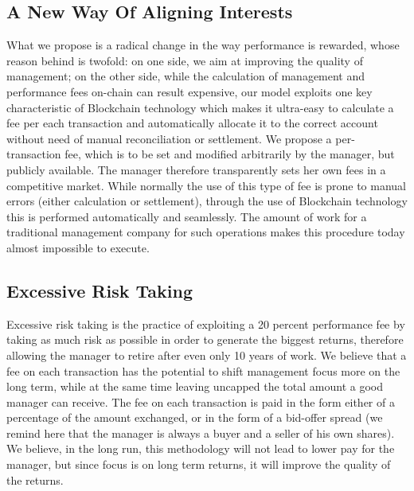 \documentclass[9pt,oneside]{amsart}
\begin{document}
\begin{multicols}{2}
\subsection{A New Way Of Aligning Interests}
What we propose is a radical change in the way performance is rewarded, whose reason behind is twofold: on one side, we aim at improving the quality of management; on the other side, while the calculation of management and performance fees on-chain can result expensive, our model exploits one key characteristic of Blockchain technology which makes it ultra-easy to calculate a fee per each transaction and automatically allocate it to the correct account without need of manual reconciliation or settlement.
We propose a per-transaction fee, which is to be set and modified arbitrarily by the manager, but publicly available. The manager therefore transparently sets her own fees in a competitive market. While normally the use of this type of fee is prone to manual errors (either calculation or settlement), through the use of Blockchain technology this is performed automatically and seamlessly. The amount of work for a traditional management company for such operations makes this procedure today almost impossible to execute.

\subsection{Excessive Risk Taking}
Excessive risk taking is the practice of exploiting a 20 percent performance fee by taking as much risk as possible in order to generate the biggest returns, therefore allowing the manager to retire after even only 10 years of work. We believe that a fee on each transaction has the potential to shift management focus more on the long term, while at the same time leaving uncapped the total amount a good manager can receive. The fee on each transaction is paid in the form either of a percentage of the amount exchanged, or in the form of a bid-offer spread (we remind here that the manager is always a buyer and a seller of his own shares). We believe, in the long run, this methodology will not lead to lower pay for the manager, but since focus is on long term returns, it will improve the quality of the returns.



\end{multicols}
\end{document}
